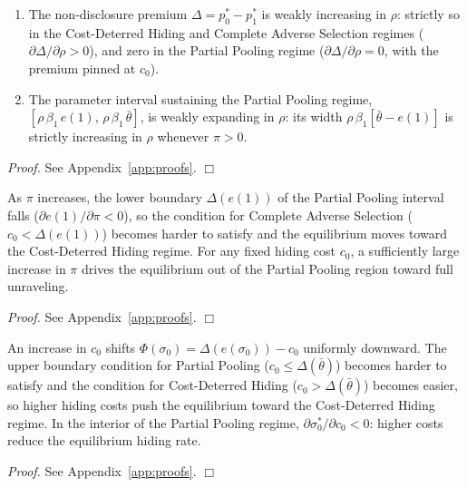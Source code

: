 \documentclass[10pt,letterpaper]{bp-template-concise}
\begin{document}
\begin{corollary}
\label{cor:rho}
\begin{enumerate}[label=(\roman*)]
    \item The non-disclosure premium $\Delta = p_0^* - p_1^*$ is weakly increasing in $\rho$: strictly so in the Cost-Deterred Hiding and Complete Adverse Selection regimes ($\partial\Delta/\partial\rho > 0$), and zero in the Partial Pooling regime ($\partial\Delta/\partial\rho = 0$, with the premium pinned at $c_0$).
    \item The parameter interval sustaining the Partial Pooling regime, $[\rho\,\beta_1\,e(1),\,\rho\,\beta_1\,\bar{\theta}]$, is weakly expanding in $\rho$: its width $\rho\,\beta_1[\bar{\theta}-e(1)]$ is strictly increasing in $\rho$ whenever $\pi>0$.
\end{enumerate}
\end{corollary}

\noindent\textit{Proof.} See Appendix~\ref{app:proofs}. $\Box$

\begin{proposition}
\label{prop:pi}
As $\pi$ increases, the lower boundary $\Delta(e(1))$ of the Partial Pooling interval falls ($\partial e(1)/\partial\pi < 0$), so the condition for Complete Adverse Selection ($c_0 < \Delta(e(1))$) becomes harder to satisfy and the equilibrium moves toward the Cost-Deterred Hiding regime. For any fixed hiding cost $c_0$, a sufficiently large increase in $\pi$ drives the equilibrium out of the Partial Pooling region toward full unraveling.
\end{proposition}

\noindent\textit{Proof.} See Appendix~\ref{app:proofs}. $\Box$

\begin{proposition}
\label{prop:c0}
An increase in $c_0$ shifts $\Phi(\sigma_0) = \Delta(e(\sigma_0)) - c_0$ uniformly downward. The upper boundary condition for Partial Pooling ($c_0 \leq \Delta(\bar{\theta})$) becomes harder to satisfy and the condition for Cost-Deterred Hiding ($c_0 > \Delta(\bar{\theta})$) becomes easier, so higher hiding costs push the equilibrium toward the Cost-Deterred Hiding regime. In the interior of the Partial Pooling regime, $\partial\sigma_0^*/\partial c_0 < 0$: higher costs reduce the equilibrium hiding rate.
\end{proposition}

\noindent\textit{Proof.} See Appendix~\ref{app:proofs}. $\Box$
\end{document}
